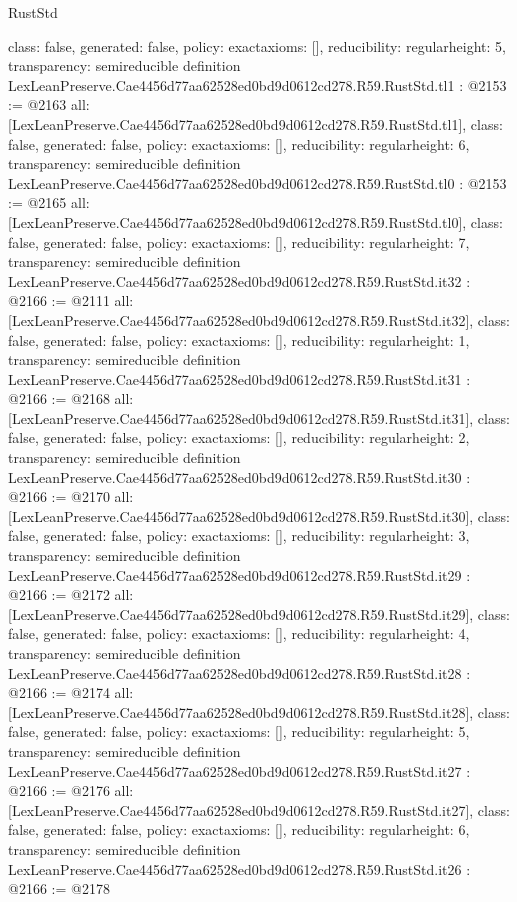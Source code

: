 \begin{lexlean}{RustStd}
\begin{coremodule}
{  class: false,
  generated: false,
  policy: exact{axioms: []},
  reducibility: regular{height: 5},
  transparency: semireducible
}
definition LexLeanPreserve.Cae4456d77aa62528ed0bd9d0612cd278.R59.RustStd.tl1 : @2153 := @2163 {
  all: [LexLeanPreserve.Cae4456d77aa62528ed0bd9d0612cd278.R59.RustStd.tl1],
  class: false,
  generated: false,
  policy: exact{axioms: []},
  reducibility: regular{height: 6},
  transparency: semireducible
}
definition LexLeanPreserve.Cae4456d77aa62528ed0bd9d0612cd278.R59.RustStd.tl0 : @2153 := @2165 {
  all: [LexLeanPreserve.Cae4456d77aa62528ed0bd9d0612cd278.R59.RustStd.tl0],
  class: false,
  generated: false,
  policy: exact{axioms: []},
  reducibility: regular{height: 7},
  transparency: semireducible
}
definition LexLeanPreserve.Cae4456d77aa62528ed0bd9d0612cd278.R59.RustStd.it32 : @2166 := @2111 {
  all: [LexLeanPreserve.Cae4456d77aa62528ed0bd9d0612cd278.R59.RustStd.it32],
  class: false,
  generated: false,
  policy: exact{axioms: []},
  reducibility: regular{height: 1},
  transparency: semireducible
}
definition LexLeanPreserve.Cae4456d77aa62528ed0bd9d0612cd278.R59.RustStd.it31 : @2166 := @2168 {
  all: [LexLeanPreserve.Cae4456d77aa62528ed0bd9d0612cd278.R59.RustStd.it31],
  class: false,
  generated: false,
  policy: exact{axioms: []},
  reducibility: regular{height: 2},
  transparency: semireducible
}
definition LexLeanPreserve.Cae4456d77aa62528ed0bd9d0612cd278.R59.RustStd.it30 : @2166 := @2170 {
  all: [LexLeanPreserve.Cae4456d77aa62528ed0bd9d0612cd278.R59.RustStd.it30],
  class: false,
  generated: false,
  policy: exact{axioms: []},
  reducibility: regular{height: 3},
  transparency: semireducible
}
definition LexLeanPreserve.Cae4456d77aa62528ed0bd9d0612cd278.R59.RustStd.it29 : @2166 := @2172 {
  all: [LexLeanPreserve.Cae4456d77aa62528ed0bd9d0612cd278.R59.RustStd.it29],
  class: false,
  generated: false,
  policy: exact{axioms: []},
  reducibility: regular{height: 4},
  transparency: semireducible
}
definition LexLeanPreserve.Cae4456d77aa62528ed0bd9d0612cd278.R59.RustStd.it28 : @2166 := @2174 {
  all: [LexLeanPreserve.Cae4456d77aa62528ed0bd9d0612cd278.R59.RustStd.it28],
  class: false,
  generated: false,
  policy: exact{axioms: []},
  reducibility: regular{height: 5},
  transparency: semireducible
}
definition LexLeanPreserve.Cae4456d77aa62528ed0bd9d0612cd278.R59.RustStd.it27 : @2166 := @2176 {
  all: [LexLeanPreserve.Cae4456d77aa62528ed0bd9d0612cd278.R59.RustStd.it27],
  class: false,
  generated: false,
  policy: exact{axioms: []},
  reducibility: regular{height: 6},
  transparency: semireducible
}
definition LexLeanPreserve.Cae4456d77aa62528ed0bd9d0612cd278.R59.RustStd.it26 : @2166 := @2178 {
}
\end{coremodule}
\end{lexlean}
